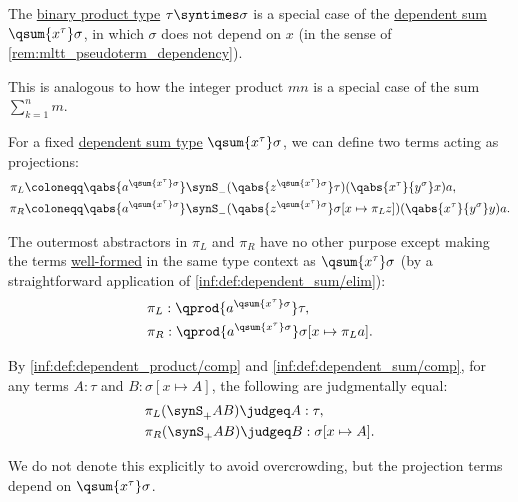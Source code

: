\begin{remark}\label{rem:dependent_sum_as_binary_product}
  The \hyperref[def:simple_product_type]{binary product type} \( \tau \syntimes \sigma \) is a special case of the \hyperref[def:dependent_product]{dependent sum} \( \qsum {x^\tau} \sigma \), in which \( \sigma \) does not depend on \( x \) (in the sense of \cref{rem:mltt_pseudoterm_dependency}).

  This is analogous to how the integer product \( mn \) is a special case of the sum \( \sum_{k=1}^n m \).
\end{remark}

\begin{definition}\label{def:dependent_sum_projections}\mimprovised
  For a fixed \hyperref[def:dependent_sum]{dependent sum type} \( \qsum {x^\tau} \sigma \), we can define two terms acting as projections:
  \begin{align*}
    \pi_L &\coloneqq \qabs {a^{\qsum {x^\tau} \sigma}} \synS_- (\qabs {z^{\qsum {x^\tau} \sigma}} \tau) (\qabs {x^\tau} {y^\sigma} x) a, \\
    \pi_R &\coloneqq \qabs {a^{\qsum {x^\tau} \sigma}} \synS_- (\qabs {z^{\qsum {x^\tau} \sigma}} \sigma[x \mapsto \pi_L z]) (\qabs {x^\tau} {y^\sigma} y) a.
  \end{align*}

  The outermost abstractors in \( \pi_L \) and \( \pi_R \) have no other purpose except making the terms \hyperref[def:mltt_well_formed_context/type]{well-formed} in the same type context as \( \qsum {x^\tau} \sigma \) (by a straightforward application of \ref{inf:def:dependent_sum/elim}):
  \begin{align*}
    &\pi_L: \qprod {a^{\qsum {x^\tau} \sigma}} \tau, \\
    &\pi_R: \qprod {a^{\qsum {x^\tau} \sigma}} \sigma[x \mapsto \pi_L a].
  \end{align*}

  By \ref{inf:def:dependent_product/comp} and \ref{inf:def:dependent_sum/comp}, for any terms \( A: \tau \) and \( B: \sigma[x \mapsto A] \), the following are judgmentally equal:
  \begin{align*}
    &\pi_L (\synS_+ A B) \judgeq A: \tau, \\
    &\pi_R (\synS_+ A B) \judgeq B: \sigma[x \mapsto A].
  \end{align*}
\end{definition}
\begin{comments}
  \item We do not denote this explicitly to avoid overcrowding, but the projection terms depend on \( \qsum {x^\tau} \sigma \).
\end{comments}

